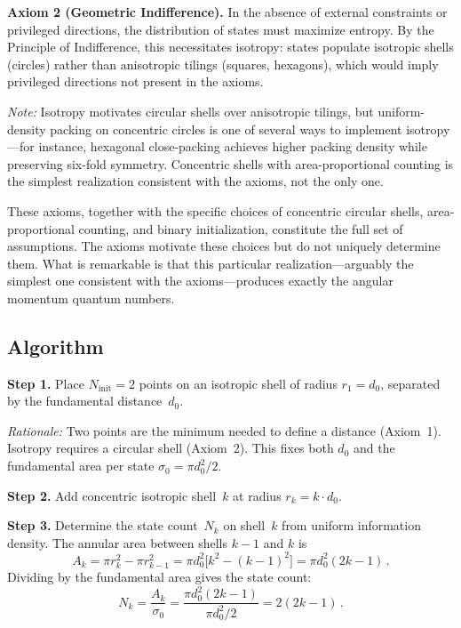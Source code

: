 \documentclass[aps,prl,reprint,amsmath,amssymb]{revtex4-2}
\begin{document}
\medskip

\noindent\textbf{Axiom 2 (Geometric Indifference).}
In the absence of external constraints or privileged directions, the
distribution of states must maximize entropy.  By the Principle of
Indifference, this necessitates isotropy: states populate isotropic
shells (circles) rather than anisotropic tilings (squares, hexagons),
which would imply privileged directions not present in the axioms.

\textit{Note:} Isotropy motivates circular shells over anisotropic
tilings, but uniform-density packing on concentric circles is one of
several ways to implement isotropy---for instance, hexagonal
close-packing achieves higher packing density while preserving
six-fold symmetry.  Concentric shells with area-proportional counting
is the simplest realization consistent with the axioms, not the only
one.

\medskip

These axioms, together with the specific choices of concentric
circular shells, area-proportional counting, and binary initialization,
constitute the full set of assumptions.  The axioms motivate these
choices but do not uniquely determine them.  What is remarkable is that
this particular realization---arguably the simplest one consistent with
the axioms---produces exactly the angular momentum quantum numbers.

\subsection{Algorithm}

\noindent\textbf{Step 1.}  Place $N_{\mathrm{init}} = 2$ points on an
isotropic shell of radius $r_1 = d_0$, separated by the fundamental
distance~$d_0$.

\textit{Rationale:} Two points are the minimum needed to define a
distance (Axiom~1).  Isotropy requires a circular shell (Axiom~2).
This fixes both $d_0$ and the fundamental area per state
$\sigma_0 = \pi d_0^2 / 2$.

\medskip

\noindent\textbf{Step 2.}  Add concentric isotropic shell~$k$ at
radius $r_k = k \cdot d_0$.

\medskip

\noindent\textbf{Step 3.}  Determine the state count~$N_k$ on
shell~$k$ from uniform information density.  The annular area between
shells $k-1$ and $k$ is
\begin{equation}
  A_k = \pi r_k^2 - \pi r_{k-1}^2
      = \pi d_0^2 \bigl[k^2 - (k-1)^2\bigr]
      = \pi d_0^2 (2k - 1) \,.
  \label{eq:annular-area}
\end{equation}
Dividing by the fundamental area gives the state count:
\begin{equation}
  N_k = \frac{A_k}{\sigma_0}
      = \frac{\pi d_0^2 (2k-1)}{\pi d_0^2 / 2}
      = 2(2k - 1) \,.
  \label{eq:Nk}
\end{equation}
\end{document}
